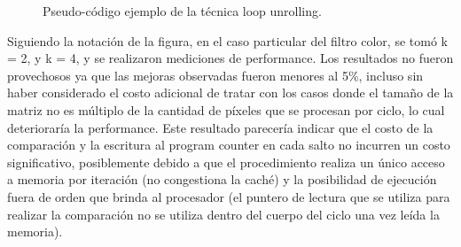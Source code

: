 \begin{figure}[h]
	\begin{mdframed}
			\colplacechunks
	\end{mdframed}
	\caption{Pseudo-código ejemplo de la técnica loop unrolling.}
	\label{fig:filtro-color-loop-unrolling}
\end{figure}


Siguiendo la notación de la figura, en el caso particular del filtro color, se tomó k = 2, y k = 4, y se realizaron mediciones de performance. Los resultados no fueron provechosos ya que las mejoras observadas fueron menores al 5\%, incluso sin haber considerado el costo adicional de tratar con los casos donde el tamaño de la matriz no es múltiplo de la cantidad de píxeles que se procesan por ciclo, lo cual deterioraría la performance. Este resultado parecería indicar que el costo de la comparación y la escritura al program counter en cada salto no incurren un costo significativo, posiblemente debido a que el procedimiento realiza un único acceso a memoria por iteración (no congestiona la caché) y la posibilidad de ejecución fuera de orden que brinda al procesador (el puntero de lectura que se utiliza para realizar la comparación no se utiliza dentro del cuerpo del ciclo una vez leída la memoria).
